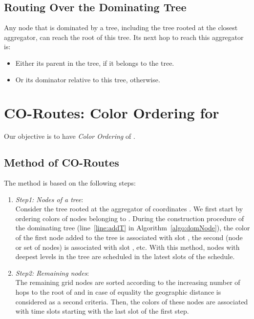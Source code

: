 \subsection{Routing Over the Dominating Tree}
Any node that is dominated by a tree, including the tree rooted at the closest aggregator, can reach the root of this tree. Its next hop to reach this aggregator is:
\begin{itemize}
\item Either its parent in the tree, if it belongs to the tree.
\item Or its dominator relative to this tree, otherwise.
\end{itemize}

\section{CO-Routes: Color Ordering for }\label{sec:ordering}
Our objective is to have \textit{Color Ordering} of . 



\subsection{Method of CO-Routes}\label{sec:methOrder}
\begin{method}[CO-Routes]\label{meth:orderColor}

The method is based on the following steps:\begin{enumerate}
\item \textit{Step1: Nodes of a tree}:\\
Consider the tree  rooted at the aggregator  of coordinates . We first start by ordering colors of nodes belonging to .
During the construction procedure of the dominating tree (line~\ref{line:addT} in Algorithm~\ref{algo:domNode}), the color of the first node added to the tree is associated with slot , the second (node or set of nodes) is associated with slot , etc. With this method, nodes with deepest levels in the tree are scheduled in the latest slots of the schedule. \item \textit{Step2: Remaining nodes}: \\
The remaining grid nodes are sorted according to the increasing number of hops to the root of  and in case of equality the geographic distance is considered as a second criteria.
Then, the colors of these nodes are associated with time slots starting with the last slot of the first step.
\end{enumerate}
\end{method}

